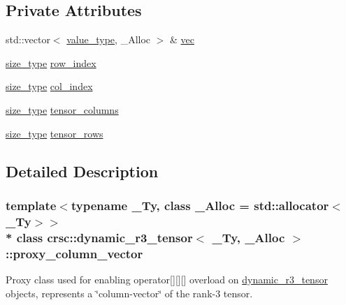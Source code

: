\subsection*{Private Attributes}
\begin{DoxyCompactItemize}
\item 
std\+::vector$<$ \hyperlink{classcrsc_1_1dynamic__r3__tensor_ad7fb44388c819fb7947771da18bb625b}{value\+\_\+type}, \+\_\+\+Alloc $>$ \& \hyperlink{classcrsc_1_1dynamic__r3__tensor_1_1proxy__column__vector_a8c6eba63e47115cc0ea6134765eab96c}{vec}
\item 
\hyperlink{classcrsc_1_1dynamic__r3__tensor_a00e5f1f46f16d0c0ac1cffa6bd0fe862}{size\+\_\+type} \hyperlink{classcrsc_1_1dynamic__r3__tensor_1_1proxy__column__vector_a78930c2c87aeee61f146badbaede5c0d}{row\+\_\+index}
\item 
\hyperlink{classcrsc_1_1dynamic__r3__tensor_a00e5f1f46f16d0c0ac1cffa6bd0fe862}{size\+\_\+type} \hyperlink{classcrsc_1_1dynamic__r3__tensor_1_1proxy__column__vector_a59e0a13c7b1474b12210377a93a5b76b}{col\+\_\+index}
\item 
\hyperlink{classcrsc_1_1dynamic__r3__tensor_a00e5f1f46f16d0c0ac1cffa6bd0fe862}{size\+\_\+type} \hyperlink{classcrsc_1_1dynamic__r3__tensor_1_1proxy__column__vector_aa73c1f9df89285bb97e6741fe94c5864}{tensor\+\_\+columns}
\item 
\hyperlink{classcrsc_1_1dynamic__r3__tensor_a00e5f1f46f16d0c0ac1cffa6bd0fe862}{size\+\_\+type} \hyperlink{classcrsc_1_1dynamic__r3__tensor_1_1proxy__column__vector_a86e5bfd2d8594915b8abd8aafc640277}{tensor\+\_\+rows}
\end{DoxyCompactItemize}


\subsection{Detailed Description}
\subsubsection*{template$<$typename \+\_\+\+Ty, class \+\_\+\+Alloc = std\+::allocator$<$\+\_\+\+Ty$>$$>$\\*
class crsc\+::dynamic\+\_\+r3\+\_\+tensor$<$ \+\_\+\+Ty, \+\_\+\+Alloc $>$\+::proxy\+\_\+column\+\_\+vector}

Proxy class used for enabling operator\mbox{[}\mbox{]}\mbox{[}\mbox{]}\mbox{[}\mbox{]} overload on \hyperlink{classcrsc_1_1dynamic__r3__tensor}{dynamic\+\_\+r3\+\_\+tensor} objects, represents a \char`\"{}column-\/vector\char`\"{} of the rank-\/3 tensor. 


